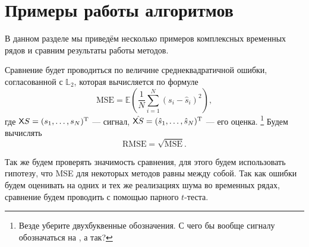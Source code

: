 \documentclass[specialist,
               substylefile = spbu.rtx,
               subf,href,colorlinks=true, 12pt]{disser}
\begin{document}
%
%

\section{Примеры работы алгоритмов}
В данном разделе мы приведём несколько примеров комплексных временных рядов и сравним результаты работы методов.

Сравнение будет проводиться по величине среднеквадратичной ошибки, согласованной с $\mathbb{L}_2$, которая вычисляется по формуле
\begin{equation}\label{MSE}
	\text{MSE} = \mathbb{E} \left(\frac{1}{N} \sum \limits_{i=1}^{N}(s_i - \hat s_i )^2 \right),
\end{equation}
где $\textsf{X}{S}=(s_1,\ldots,s_N)^\mathrm{T}$ --- сигнал, $\hat{\textsf{X}{S}}=(\hat{s}_1,\ldots,\hat{s}_N)^\mathrm{T}$ --- его оценка.
\footnote{Везде уберите двухбуквенные обозначения. С чего бы вообще сигналу обозначаться на \tS, а так?}
Будем вычислять
\begin{equation*}
	\text{RMSE} = \sqrt{\textrm{MSE}}.
\end{equation*}

Так же будем проверять значимость сравнения, для этого будем использовать гипотезу, что MSE для некоторых методов равны между собой. Так как ошибки будем оценивать на одних и тех же реализациях шума во временных рядах, сравнение будем проводить с помощью парного $t$-теста.

\end{document}
